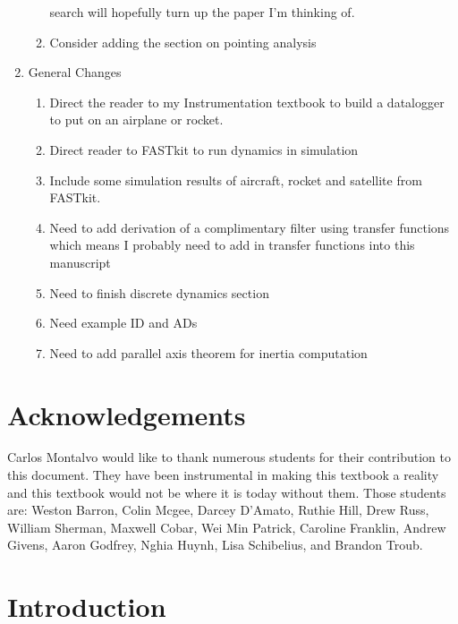 \documentclass{article}
\begin{document}
\begin{enumerate}[itemsep=-5pt]
\begin{enumerate}[itemsep=-5pt]
    search will hopefully turn up the paper I'm thinking of.
  \item Consider adding the section on pointing analysis
  \end{enumerate}
\item General Changes
  \begin{enumerate}[itemsep=-5pt]
  \item Direct the reader to my Instrumentation textbook to build a
    datalogger to put on an airplane or rocket.
  \item Direct reader to FASTkit to run dynamics in simulation
  \item Include some simulation results of aircraft, rocket and
    satellite from FASTkit.
  \item Need to add derivation of a complimentary filter using
    transfer functions which means I probably need to add in transfer
    functions into this manuscript
  \item Need to finish discrete dynamics section
  \item Need example ID and ADs
  \item Need to add parallel axis theorem for inertia computation
  \end{enumerate}
\end{enumerate}

\section*{Acknowledgements}

Carlos Montalvo would like to thank numerous students for their
contribution to this document. They have been instrumental in making
this textbook a reality and this textbook would not be where it is
today without them. Those students are: Weston Barron, Colin Mcgee,
Darcey D'Amato, Ruthie Hill, Drew Russ, William Sherman, Maxwell Cobar, Wei Min Patrick, Caroline
Franklin, Andrew Givens, Aaron Godfrey, Nghia Huynh, Lisa Schibelius,
and Brandon Troub.

\newpage

\tableofcontents

\newpage


\section{Introduction}
\end{document}
